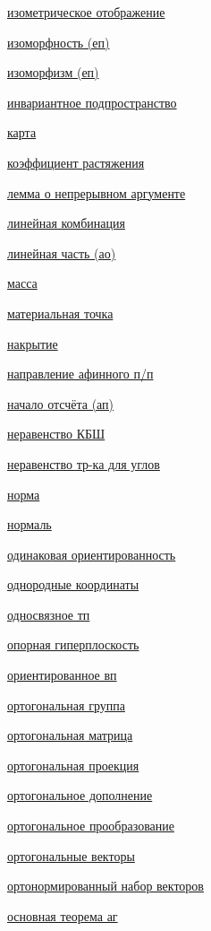 \documentclass[a4paper,100pt]{article}
\theoremstyle{indented}
\theoremstyle{definition}
\theoremstyle{remark}
\begin{document}
\begin{multicols}{2}
    \hyperlink{s72}{изометрическое отображение} \ 

    \hyperlink{s65}{изоморфность (еп)} \ 

    \hyperlink{s66}{изоморфизм (еп)} \ 

    \hyperlink{s77}{инвариантное подпространство} \ 

    \hyperlink{s40}{карта} \
    
    \hyperlink{s30}{коэффициент растяжения} \ 

    \hyperlink{s121}{лемма о непрерывном аргументе} \ 
    
    \hyperlink{s7}{линейная комбинация} \ 
    
    \hyperlink{s27}{линейная часть (ао)} \ 
    
    \hyperlink{s11}{масса} \ 
    
    \hyperlink{s10}{материальная точка} \ 

    \hyperlink{s116}{накрытие} \ 
    
    \hyperlink{s14}{направление афинного п/п} \ 
    
    \hyperlink{s5}{начало отсчёта (ап)} \ 

    \hyperlink{s57}{неравенство КБШ} \ 

    \hyperlink{s60}{неравенство тр-ка для углов} \ 

    \hyperlink{s55}{норма} \ 

    \hyperlink{s69}{нормаль} \ 

    \hyperlink{s78}{одинаковая ориентированность} \ 
    
    \hyperlink{s36}{однородные координаты} \ 

    \hyperlink{s115}{односвязное тп} \ 

    \hyperlink{s100}{опорная гиперплоскость} \ 

    \hyperlink{s79}{ориентированное вп} \ 

    \hyperlink{s74}{ортогональная группа} \ 

    \hyperlink{s75}{ортогональная матрица} \ 

    \hyperlink{s68}{ортогональная проекция} \ 

    \hyperlink{s67}{ортогональное дополнение} \ 

    \hyperlink{s73}{ортогональное прообразование} \ 

    \hyperlink{s61}{ортогональные векторы} \ 

    \hyperlink{s63}{ортонормированный набор векторов} \ 
    
    \hyperlink{s31}{основная теорема аг} \ 


\end{multicols}
\end{document}
